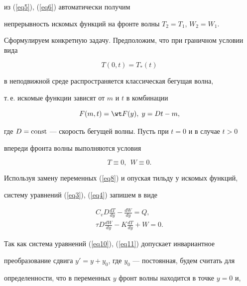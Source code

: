 из (\ref{eq5}), (\ref{eq6}) автоматически получим


непрерывность искомых функций на фронте волны $T_2=T_1$, $W_2=W_1$.





Сформулируем конкретную задачу. Предположим, что при граничном условии вида


\begin{equation}\label{eq7}


T(0,t)=T_*(t)


\end{equation}


в неподвижной среде распространяется классическая бегущая волна, 


т.\,е. искомые функции зависят от $m$ и $t$ в комбинации


\begin{equation}\label{eq8}


F(m,t)=\wt F(y),\;y=Dt-m,


\end{equation}


где $D=\operatorname{const}$ --- скорость бегущей волны. Пусть при $t=0$ и в случае $t>0$


впереди фронта волны выполняются условия


\begin{equation}\label{eq9}


T\equiv0,\ \ W\equiv0.


\end{equation}


Используя замену переменных (\ref{eq8}) и опуская тильду у искомых функций,


систему уравнений (\ref{eq3}), (\ref{eq4}) запишем в виде


\begin{gather}


\label{eq10}


C_vD\frac{dT}{dy}-\frac{dW}{dy}=Q,\\


\label{eq11}


\tau D\frac{dW}{dy}-K\frac{dT}{dy}+W=0.


\end{gather}


Так как система уравнений (\ref{eq10}), (\ref{eq11}) допускает инвариантное


преобразование сдвига $y'=y+y_0$, где $y_0$ --- постоянная, будем считать для


определенности, что в переменных $y$ фронт волны находится в точке $y=0$ и,


